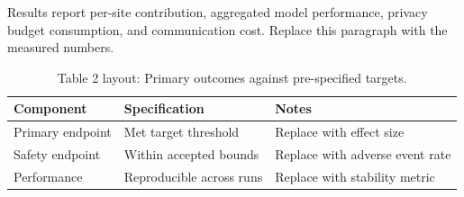 
Results report per-site contribution, aggregated model performance, privacy budget consumption, and communication cost. Replace this paragraph with the measured numbers.

\begin{table}[H]
\caption{Table 2 layout: Primary outcomes against pre-specified targets.}
\label{tab:results_primary}
\centering
\begin{tabular}{>{\raggedright\arraybackslash}p{3.4cm} >{\raggedright\arraybackslash}p{4.6cm} >{\raggedright\arraybackslash}p{5.4cm}}
\toprule
\textbf{Component} & \textbf{Specification} & \textbf{Notes} \\
\midrule
  Primary endpoint & Met target threshold & Replace with effect size \\
  Safety endpoint & Within accepted bounds & Replace with adverse event rate \\
  Performance & Reproducible across runs & Replace with stability metric \\
\bottomrule
\end{tabular}
\end{table}
